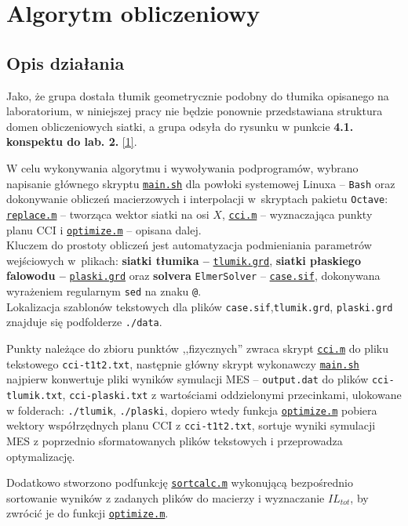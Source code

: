\documentclass{sprawozdanie-agh}
\begin{document}
\section{Algorytm obliczeniowy}
\subsection{Opis działania}
Jako, że grupa dostała tłumik geometrycznie podobny do tłumika opisanego na laboratorium, w niniejszej pracy nie będzie ponownie przedstawiana struktura domen obliczeniowych siatki, a grupa odsyła do rysunku w punkcie \textbf{4.1. konspektu do lab. 2.} \hyperref[ref1]{[1]}.
\par W celu wykonywania algorytmu i wywoływania podprogramów, wybrano napisanie głównego skryptu \texttt{\hyperref[list1]{main.sh}} dla powłoki systemowej Linuxa -- \texttt{Bash} oraz dokonywanie obliczeń macierzowych i interpolacji w~skryptach pakietu \texttt{Octave}: \texttt{\hyperref[list5]{replace.m}} -- tworząca wektor siatki na osi $X$, \texttt{\hyperref[list7]{cci.m}} -- wyznaczająca punkty planu CCI i  \texttt{\hyperref[list6]{optimize.m}} -- opisana dalej.\\ Kluczem do prostoty obliczeń jest automatyzacja podmieniania parametrów wejściowych w~plikach: \textbf{siatki tłumika --} \texttt{\hyperref[list2]{tlumik.grd}}, \textbf{siatki płaskiego falowodu --} \texttt{\hyperref[list3]{plaski.grd}} oraz \textbf{solvera} \texttt{ElmerSolver} -- \texttt{\hyperref[list4]{case.sif}}, dokonywana wyrażeniem regularnym \texttt{\color{orange}sed} na znaku \texttt{\color{green}@}.\\
Lokalizacja szablonów tekstowych dla plików \texttt{case.sif},\texttt{tlumik.grd}, \texttt{plaski.grd} znajduje się podfolderze \texttt{./data}.
\par Punkty należące do zbioru punktów ,,fizycznych'' zwraca skrypt \hyperref[list7]{\texttt{cci.m}} do pliku tekstowego \texttt{cci-t1t2.txt}, następnie główny skrypt wykonawczy \texttt{\hyperref[list1]{main.sh}} najpierw konwertuje pliki wyników symulacji MES -- \texttt{output.dat} do plików \texttt{cci-tlumik.txt}, \texttt{cci-plaski.txt} z wartościami oddzielonymi przecinkami,  ulokowane w folderach: \texttt{./tlumik}, \texttt{./plaski}, dopiero wtedy funkcja \hyperref[list6]{\texttt{optimize.m}} pobiera wektory współrzędnych planu CCI z \texttt{cci-t1t2.txt}, sortuje wyniki symulacji MES z poprzednio sformatowanych plików tekstowych i przeprowadza optymalizację.
\par Dodatkowo stworzono podfunkcję \texttt{\hyperref[list8]{sortcalc.m}} wykonującą bezpośrednio sortowanie wyników z zadanych plików do macierzy i wyznaczanie $IL_{tot}$, by zwrócić je do funkcji \hyperref[list6]{\texttt{optimize.m}}.
\end{document}
